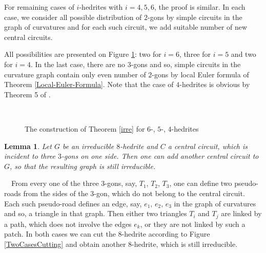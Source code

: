 \documentclass[12pt]{article}
\newtheorem{lemma}{Lemma}
\newcommand{\proof}{\noindent{\bf Proof.}\ \ }
\begin{document}
For remaining cases of $i$-hedrites with $i=4,5,6$, the proof is similar. In each case, we consider all possible distribution of $2$-gons by simple circuits in the graph of curvatures and for each such circuit, we add suitable number of new central circuits.


All possibilities are presented on Figure \ref{The456hedriteCases}:
two for $i=6$, three for $i=5$ and two for $i=4$. In the last case, there
are no $3$-gons and so, simple circuits in the curvature graph contain
only even number of $2$-gons by local Euler formula of Theorem 
\ref{Local-Euler-Formula}. Note that the case of $4$-hedrites is
obvious by Theorem 5 of \cite{DSt}.



\begin{figure}
\centering
\mbox{\quad
{}\quad
{}}
\caption{The construction of Theorem \ref{irre} for $6$-, $5$-, $4$-hedrites}
\label{The456hedriteCases}
\end{figure}




\begin{lemma}
Let $G$ be an irreducible $8$-hedrite and $C$ a central circuit,
which is incident to three $3$-gons on one side. Then one can add another central circuit to $G$,  so that the resulting graph is still irreducible.
\end{lemma}
\proof From every one of the three $3$-gons, say, $T_1$, $T_2$, $T_3$, one can define two pseudo-roads from the sides of the $3$-gon, which do not belong to the central circuit.
Each such pseudo-road defines an edge, say, $e_1$, $e_2$, $e_3$ in the graph 
of curvatures and so, a triangle in that graph. Then either two triangles 
$T_i$ and $T_j$ are linked by a path, which does not involve the edges $e_k$,
or they are not linked by such a patch. In both cases we can cut the 
$8$-hedrite according to Figure \ref{TwoCasesCutting} and obtain 
another $8$-hedrite, which is still irreducible.
\end{document}
